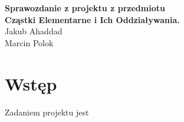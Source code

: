 {
	\centering
	{\large\bfseries Sprawozdanie z projektu z przedmiotu \\
	Cząstki Elementarne i Ich Oddziaływania.\\}
	\vspace{1em}
	{
	Jakub Ahaddad\\

	Marcin Polok\\
	}
	\vspace{3em}
}

\section{Wstęp}
Zadaniem projektu jest 
